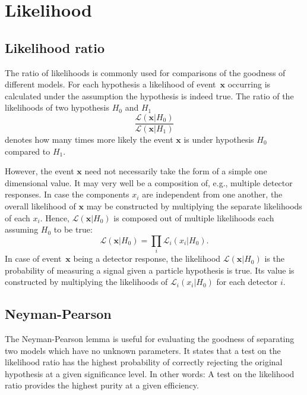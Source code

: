 \section{Likelihood}
\label{sec:likelihood}

\subsection{Likelihood ratio}
\label{sec:likelihood_ratios}

The ratio of likelihoods is commonly used for comparisons of the goodness of different models. For each hypothesis a likelihood of event~$\pmb{x}$ occurring is calculated under the assumption the hypothesis is indeed true. The ratio of the likelihoods of two hypothesis $H_0$ and $H_1$
\begin{equation}
	\frac{\mathcal{L}(\pmb{x}|H_0)}{\mathcal{L}(\pmb{x}|H_1)}
\end{equation}
denotes how many times more likely the event $\pmb{x}$ is under hypothesis $H_0$ compared to $H_1$.

However, the event $\pmb{x}$ need not necessarily take the form of a simple one dimensional value. It may very well be a composition of, e.g., multiple detector responses. In case the components $x_i$ are independent from one another, the overall likelihood of $\pmb{x}$ may be constructed by multiplying the separate likelihoods of each $x_i$. Hence, $\mathcal{L}(\pmb{x}|H_0)$ is composed out of multiple likelihoods each assuming $H_0$ to be true:
\begin{equation}
	\mathcal{L}(\pmb{x}|H_0) = \prod \limits_{i} \mathcal{L}_i(x_i|H_0).
\end{equation}
In case of event~$\pmb{x}$ being a detector response, the likelihood $\mathcal{L}(\pmb{x}|H_0)$ is the probability of measuring a signal given a particle hypothesis is true. Its value is constructed by multiplying the likelihoods of $\mathcal{L}_i(x_i|H_0)$ for each detector $i$.

\subsection{Neyman-Pearson}
\label{sec:likelihood_ratios_neyman_pearson}

The Neyman-Pearson lemma is useful for evaluating the goodness of separating two models which have no unknown parameters. It states that a test on the likelihood ratio has the highest probability of correctly rejecting the original hypothesis at a given significance level. In other words: A test on the likelihood ratio provides the highest purity at a given efficiency.

